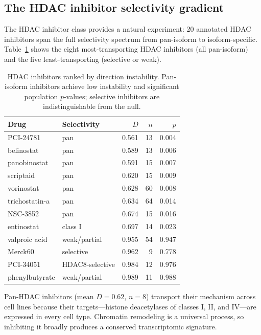 \documentclass{article}
\begin{document}
\subsection{The HDAC inhibitor selectivity gradient}
\label{sec:hdac}

The HDAC inhibitor class provides a natural experiment: 20 annotated HDAC
inhibitors span the full selectivity spectrum from pan-isoform to
isoform-specific. Table~\ref{tab:hdac} shows the eight most-transporting
HDAC inhibitors (all pan-isoform) and the five least-transporting
(selective or weak).

\begin{table}[t]
\centering
\caption{HDAC inhibitors ranked by direction instability. Pan-isoform
inhibitors achieve low instability and significant population $p$-values;
selective inhibitors are indistinguishable from the null.}
\label{tab:hdac}
\small
\begin{tabular}{llrrr}
\toprule
Drug & Selectivity & $D$ & $n$ & $p$ \\
\midrule
PCI-24781 & pan & 0.561 & 13 & 0.004 \\
belinostat & pan & 0.589 & 13 & 0.006 \\
panobinostat & pan & 0.591 & 15 & 0.007 \\
scriptaid & pan & 0.620 & 15 & 0.009 \\
vorinostat & pan & 0.628 & 60 & 0.008 \\
trichostatin-a & pan & 0.634 & 64 & 0.014 \\
NSC-3852 & pan & 0.674 & 15 & 0.016 \\
entinostat & class I & 0.697 & 14 & 0.023 \\
\midrule
valproic acid & weak/partial & 0.955 & 54 & 0.947 \\
Merck60 & selective & 0.962 & 9 & 0.778 \\
PCI-34051 & HDAC8-selective & 0.984 & 12 & 0.976 \\
phenylbutyrate & weak/partial & 0.989 & 11 & 0.988 \\
\bottomrule
\end{tabular}
\end{table}

Pan-HDAC inhibitors (mean $D = 0.62$, $n = 8$) transport their mechanism
across cell lines because their targets---histone deacetylases of classes
I, II, and IV---are expressed in every cell type. Chromatin remodeling is a
universal process, so inhibiting it broadly produces a conserved
transcriptomic signature.
\end{document}
